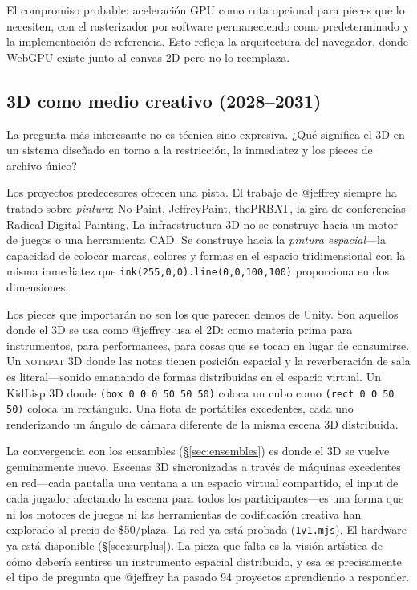 \documentclass[10pt,letterpaper,twocolumn]{article}
\newcommand{\np}{\textsc{notepat}}
\begin{document}
El compromiso probable: aceleración GPU como ruta opcional para pieces que lo necesiten, con el rasterizador por software permaneciendo como predeterminado y la implementación de referencia. Esto refleja la arquitectura del navegador, donde WebGPU existe junto al canvas 2D pero no lo reemplaza.

\subsection{3D como medio creativo (2028--2031)}

La pregunta más interesante no es técnica sino expresiva. ¿Qué significa el 3D en un sistema diseñado en torno a la restricción, la inmediatez y los pieces de archivo único?

Los proyectos predecesores ofrecen una pista. El trabajo de @jeffrey siempre ha tratado sobre \emph{pintura}: No Paint, JeffreyPaint, thePRBAT, la gira de conferencias Radical Digital Painting. La infraestructura 3D no se construye hacia un motor de juegos o una herramienta CAD. Se construye hacia la \emph{pintura espacial}---la capacidad de colocar marcas, colores y formas en el espacio tridimensional con la misma inmediatez que \texttt{ink(255,0,0).line(0,0,100,100)} proporciona en dos dimensiones.

Los pieces que importarán no son los que parecen demos de Unity. Son aquellos donde el 3D se usa como @jeffrey usa el 2D: como materia prima para instrumentos, para performances, para cosas que se tocan en lugar de consumirse. Un \np{} 3D donde las notas tienen posición espacial y la reverberación de sala es literal---sonido emanando de formas distribuidas en el espacio virtual. Un KidLisp 3D donde \texttt{(box 0 0 0 50 50 50)} coloca un cubo como \texttt{(rect 0 0 50 50)} coloca un rectángulo. Una flota de portátiles excedentes, cada uno renderizando un ángulo de cámara diferente de la misma escena 3D distribuida.

La convergencia con los ensambles (\S\ref{sec:ensembles}) es donde el 3D se vuelve genuinamente nuevo. Escenas 3D sincronizadas a través de máquinas excedentes en red---cada pantalla una ventana a un espacio virtual compartido, el input de cada jugador afectando la escena para todos los participantes---es una forma que ni los motores de juegos ni las herramientas de codificación creativa han explorado al precio de \$50/plaza. La red ya está probada (\texttt{1v1.mjs}). El hardware ya está disponible (\S\ref{sec:surplus}). La pieza que falta es la visión artística de cómo debería sentirse un instrumento espacial distribuido, y esa es precisamente el tipo de pregunta que @jeffrey ha pasado 94 proyectos aprendiendo a responder.
\end{document}
